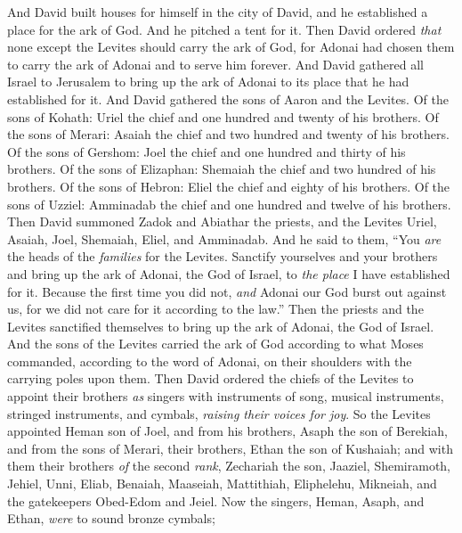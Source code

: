 \begin{biblechapter} %
 And David built houses for himself in the city of David, and he established a place for the ark of God. And he pitched a tent for it.
\verse Then David ordered \textit{that} none except the Levites should carry the ark of God, for Adonai had chosen them to carry the ark of Adonai and to serve him forever.
\verse And David gathered all Israel to Jerusalem to bring up the ark of Adonai to its place that he had established for it.
\verse And David gathered the sons of Aaron and the Levites.
\verse Of the sons of Kohath: Uriel the chief and one hundred and twenty of his brothers.
\verse Of the sons of Merari: Asaiah the chief and two hundred and twenty of his brothers.
\verse Of the sons of Gershom: Joel the chief and one hundred and thirty of his brothers.
\verse Of the sons of Elizaphan: Shemaiah the chief and two hundred of his brothers.
\verse Of the sons of Hebron: Eliel the chief and eighty of his brothers.
\verse Of the sons of Uzziel: Amminadab the chief and one hundred and twelve of his brothers.
\verse Then David summoned Zadok and Abiathar the priests, and the Levites Uriel, Asaiah, Joel, Shemaiah, Eliel, and Amminadab.
\verse And he said to them, “You \textit{are} the heads of the \textit{families} for the Levites. Sanctify yourselves and your brothers and bring up the ark of Adonai, the God of Israel, to \textit{the place} I have established for it.
\verse Because the first time you did not, \textit{and} Adonai our God burst out against us, for we did not care for it according to the law.”
\verse Then the priests and the Levites sanctified themselves to bring up the ark of Adonai, the God of Israel.
\verse And the sons of the Levites carried the ark of God according to what Moses commanded, according to the word of Adonai, on their shoulders with the carrying poles upon them.
\verse Then David ordered the chiefs of the Levites to appoint their brothers \textit{as} singers with instruments of song, musical instruments, stringed instruments, and cymbals, \textit{raising their voices for joy}.
\verse So the Levites appointed Heman son of Joel, and from his brothers, Asaph the son of Berekiah, and from the sons of Merari, their brothers, Ethan the son of Kushaiah;
\verse and with them their brothers \textit{of} the second \textit{rank}, Zechariah the son, Jaaziel, Shemiramoth, Jehiel, Unni, Eliab, Benaiah, Maaseiah, Mattithiah, Eliphelehu, Mikneiah, and the gatekeepers Obed-Edom and Jeiel.
\verse Now the singers, Heman, Asaph, and Ethan, \textit{were} to sound bronze cymbals;

\end{biblechapter}
